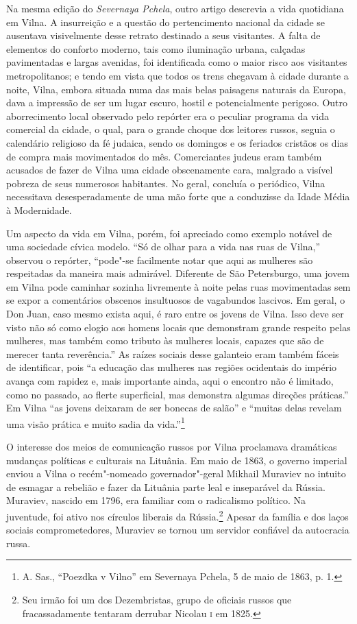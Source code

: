 Na mesma edição do \textit{Severnaya Pchela}, outro artigo descrevia a
vida quotidiana em Vilna. A insurreição e a questão do pertencimento
nacional da cidade se ausentava visivelmente desse retrato destinado a
seus visitantes. A falta de elementos do conforto moderno, tais como
iluminação urbana, calçadas pavimentadas e largas avenidas, foi
identificada como o maior risco aos visitantes metropolitanos; e tendo
em vista que todos os trens chegavam à cidade durante a noite, Vilna,
embora situada numa das mais belas paisagens naturais da Europa, dava a
impressão de ser um lugar escuro, hostil e potencialmente perigoso.
Outro aborrecimento local observado pelo repórter era o peculiar
programa da vida comercial da cidade, o qual, para o grande choque dos
leitores russos, seguia o calendário religioso da fé judaica, sendo os
domingos e os feriados cristãos os dias de compra mais movimentados do
mês. Comerciantes judeus eram também acusados de fazer de Vilna uma
cidade obscenamente cara, malgrado a visível pobreza de seus numerosos
habitantes. No geral, concluía o periódico, Vilna necessitava
desesperadamente de uma mão forte que a conduzisse da Idade Média à
Modernidade.

Um aspecto da vida em Vilna, porém, foi apreciado como exemplo notável
de uma sociedade cívica modelo. ``Só de olhar para a vida nas ruas de
Vilna,'' observou o repórter, ``pode"-se facilmente notar que aqui as
mulheres são respeitadas da maneira mais admirável. Diferente de São
Petersburgo, uma jovem em Vilna pode caminhar sozinha livremente à noite
pelas ruas movimentadas sem se expor a comentários obscenos insultuosos
de vagabundos lascivos. Em geral, o Don Juan, caso mesmo exista aqui, é
raro entre os jovens de Vilna. Isso deve ser visto não só como elogio
aos homens locais que demonstram grande respeito pelas mulheres, mas
também como tributo às mulheres locais, capazes que são de merecer tanta
reverência.'' As raízes sociais desse galanteio eram também fáceis de
identificar, pois ``a educação das mulheres nas regiões ocidentais do
império avança com rapidez e, mais importante ainda, aqui o encontro não
é limitado, como no passado, ao flerte superficial, mas demonstra
algumas direções práticas.'' Em Vilna ``as jovens deixaram de ser
bonecas de salão'' e ``muitas delas revelam uma visão prática e muito
sadia da vida.''\footnote{A. Sas., ``Poezdka v Vilno'' em Severnaya Pchela, 5 de maio de 1863, p. 1.}

O interesse dos meios de comunicação russos por Vilna proclamava
dramáticas mudanças políticas e culturais na Lituânia. Em maio de 1863,
o governo imperial enviou a Vilna o recém"-nomeado governador"-geral
Mikhail Muraviev no intuito de esmagar a rebelião e fazer da Lituânia
parte leal e inseparável da Rússia. Muraviev, nascido em 1796, era
familiar com o radicalismo político. Na juventude, foi ativo nos
círculos liberais da Rússia.\footnote{Seu irmão foi um dos Dezembristas, grupo
de oficiais russos que fracassadamente tentaram derrubar Nicolau \textsc{i} em
1825.} Apesar da família e dos laços sociais comprometedores, Muraviev
se tornou um servidor confiável da autocracia russa.

